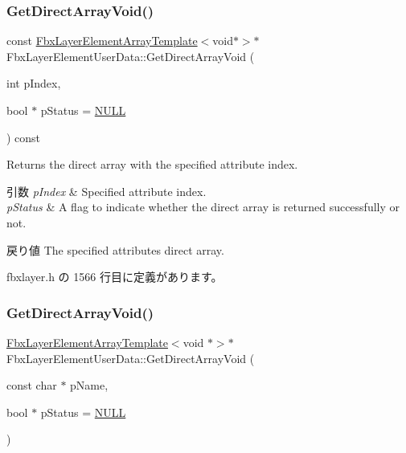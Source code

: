 \subsubsection{\texorpdfstring{Get\+Direct\+Array\+Void()}{GetDirectArrayVoid()}\hspace{0.1cm}{\footnotesize\ttfamily [2/4]}}
{\footnotesize\ttfamily const \hyperlink{class_fbx_layer_element_array_template}{Fbx\+Layer\+Element\+Array\+Template}$<$void$\ast$$>$$\ast$ Fbx\+Layer\+Element\+User\+Data\+::\+Get\+Direct\+Array\+Void (\begin{DoxyParamCaption}\item[{int}]{p\+Index,  }\item[{bool $\ast$}]{p\+Status = {\ttfamily \hyperlink{fbxarch_8h_a070d2ce7b6bb7e5c05602aa8c308d0c4}{N\+U\+LL}} }\end{DoxyParamCaption}) const\hspace{0.3cm}{\ttfamily [inline]}}

Returns the direct array with the specified attribute index. 
\begin{DoxyParams}{引数}
{\em p\+Index} & Specified attribute index. \\
\hline
{\em p\+Status} & A flag to indicate whether the direct array is returned successfully or not. \\
\hline
\end{DoxyParams}
\begin{DoxyReturn}{戻り値}
The specified attribute\textquotesingle{}s direct array. 
\end{DoxyReturn}


 fbxlayer.\+h の 1566 行目に定義があります。

\mbox{\label{class_fbx_layer_element_user_data_aefbd9aaf1002ca95053801db3f6dec53}} 
\subsubsection{\texorpdfstring{Get\+Direct\+Array\+Void()}{GetDirectArrayVoid()}\hspace{0.1cm}{\footnotesize\ttfamily [3/4]}}
{\footnotesize\ttfamily \hyperlink{class_fbx_layer_element_array_template}{Fbx\+Layer\+Element\+Array\+Template}$<$void $\ast$$>$$\ast$ Fbx\+Layer\+Element\+User\+Data\+::\+Get\+Direct\+Array\+Void (\begin{DoxyParamCaption}\item[{const char $\ast$}]{p\+Name,  }\item[{bool $\ast$}]{p\+Status = {\ttfamily \hyperlink{fbxarch_8h_a070d2ce7b6bb7e5c05602aa8c308d0c4}{N\+U\+LL}} }\end{DoxyParamCaption})\hspace{0.3cm}{\ttfamily [inline]}}

